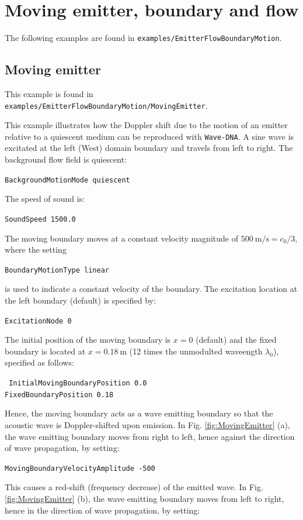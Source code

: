 \section{Moving emitter, boundary and flow}
\label{sec:Moving emitter, boundary and flow}

The following examples are found in {\tt examples/EmitterFlowBoundaryMotion}.

\subsection{Moving emitter}
\label{sec:Moving emitter}

This example is found in {\tt examples/EmitterFlowBoundaryMotion/MovingEmitter}.

This example illustrates how the Doppler shift due to the motion of an emitter relative to a quiescent medium can be reproduced with {\tt Wave-DNA}. A sine wave is excitated at the left (West) domain boundary and travels from left to right. The background flow field is quiescent:

{\tt BackgroundMotionMode quiescent}

The speed of sound is:

{\tt SoundSpeed 1500.0}

The moving boundary moves at a constant velocity magnitude of $500\:\mathrm{m/s}=c_0/3$, where the setting

{\tt BoundaryMotionType linear}

is used to indicate a constant velocity of the boundary. The excitation location at the left boundary (default) is specified by:

{\tt ExcitationNode 0}

The initial position of the moving boundary is $x=0$ (default) and the fixed boundary is located at $x=0.18\:\mathrm{m}$ (12 times the unmodulted waveength $\lambda_0$), specified as follows:

{\tt 
InitialMovingBoundaryPosition 0.0 \\
FixedBoundaryPosition 0.18
}

Hence, the moving boundary acts as a wave emitting boundary so that the acoustic wave is Doppler-shifted upon emission. In Fig. \ref{fig:MovingEmitter} (a), the wave emitting boundary moves from right to left, hence against the direction of wave propagation, by setting:

{\tt MovingBoundaryVelocityAmplitude -500}

This causes a red-shift (frequency decrease) of the emitted wave. In Fig. \ref{fig:MovingEmitter} (b), the wave emitting boundary moves from left to right, hence in the direction of wave propagation, by setting:

